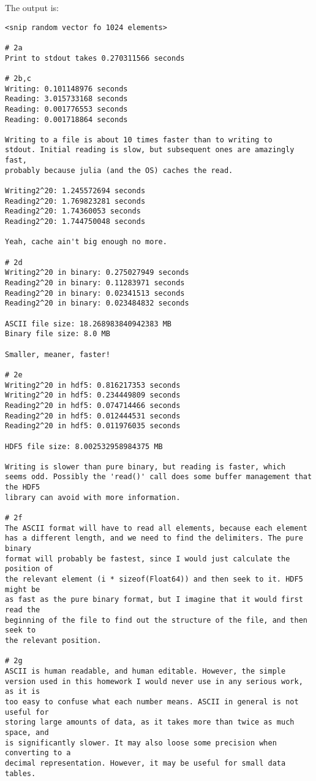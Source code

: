 \documentclass[11pt]{article}
\begin{document}
The output is:
\begin{verbatim}
<snip random vector fo 1024 elements>

# 2a
Print to stdout takes 0.270311566 seconds

# 2b,c
Writing: 0.101148976 seconds
Reading: 3.015733168 seconds
Reading: 0.001776553 seconds
Reading: 0.001718864 seconds

Writing to a file is about 10 times faster than to writing to
stdout. Initial reading is slow, but subsequent ones are amazingly fast,
probably because julia (and the OS) caches the read.

Writing2^20: 1.245572694 seconds
Reading2^20: 1.769823281 seconds
Reading2^20: 1.74360053 seconds
Reading2^20: 1.744750048 seconds

Yeah, cache ain't big enough no more.

# 2d
Writing2^20 in binary: 0.275027949 seconds
Reading2^20 in binary: 0.11283971 seconds
Reading2^20 in binary: 0.02341513 seconds
Reading2^20 in binary: 0.023484832 seconds

ASCII file size: 18.268983840942383 MB
Binary file size: 8.0 MB

Smaller, meaner, faster!

# 2e
Writing2^20 in hdf5: 0.816217353 seconds
Writing2^20 in hdf5: 0.234449809 seconds
Reading2^20 in hdf5: 0.074714466 seconds
Reading2^20 in hdf5: 0.012444531 seconds
Reading2^20 in hdf5: 0.011976035 seconds

HDF5 file size: 8.002532958984375 MB

Writing is slower than pure binary, but reading is faster, which
seems odd. Possibly the 'read()' call does some buffer management that the HDF5
library can avoid with more information.

# 2f
The ASCII format will have to read all elements, because each element
has a different length, and we need to find the delimiters. The pure binary
format will probably be fastest, since I would just calculate the position of
the relevant element (i * sizeof(Float64)) and then seek to it. HDF5 might be
as fast as the pure binary format, but I imagine that it would first read the
beginning of the file to find out the structure of the file, and then seek to
the relevant position.

# 2g
ASCII is human readable, and human editable. However, the simple
version used in this homework I would never use in any serious work, as it is
too easy to confuse what each number means. ASCII in general is not useful for
storing large amounts of data, as it takes more than twice as much space, and
is significantly slower. It may also loose some precision when converting to a
decimal representation. However, it may be useful for small data tables.


\end{verbatim}
\end{document}
